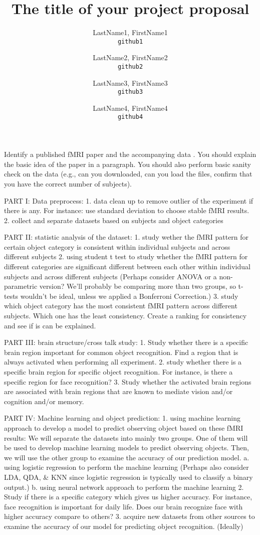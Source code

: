 \documentclass[11pt]{article}
\title{The title of your project proposal}
\author{
  LastName1, FirstName1\\
  \texttt{github1}
  \and
  LastName2, FirstName2\\
  \texttt{github2}
  \and
  LastName3, FirstName3\\
  \texttt{github3}
  \and
  LastName4, FirstName4\\
  \texttt{github4}
}
\begin{document}
\maketitle

Identify a published fMRI paper and the accompanying data
\cite{lindquist2008statistical}.  You should explain the basic idea of the
paper in a paragraph.  You should also perform basic sanity check on the data
(e.g., can you downloaded, can you load the files, confirm that you have the
correct number of subjects).



PART I: Data preprocess:
1. data clean up to remove outlier of the experiment if there is any.
For instance: use standard deviation to choose stable fMRI results.
2. collect and separate datasets based on subjects and object categories

PART II: statistic analysis of the dataset:
1. study wether the fMRI pattern for certain object category is consistent 
within individual subjects and across different subjects
2. using student t test to study whether the fMRI pattern for different 
categories are significant different between each other within individual 
subjects and across different subjects (Perhaps consider ANOVA or a non-
parametric version? We'll probably be comparing more than two groups, 
so t-tests wouldn't be ideal, unless we applied a Bonferroni Correction.)
3. study which object category has the most consistent fMRI pattern across 
different subjects. Which one has the least consistency. 
Create a ranking for consistency and see if is can be explained.

PART III: brain structure/cross talk study:
1. Study whether there is a specific brain region important for common 
object recognition. Find a region that is always activated when 
performing all experiment.
2. study whether there is a specific brain region for specific object 
recognition. For instance, is there a specific region for face recognition?
3. Study whether the activated brain regions are associated with brain 
regions that are known to mediate vision and/or cognition and/or memory.

PART IV: Machine learning and object prediction:
1. using machine learning approach to develop a model to predict observing 
object based on these fMRI results:
We will separate the datasets into mainly two groups. One of them will 
be used to develop machine learning models to predict observing objects. 
Then, we will use the other group to examine the accuracy of our 
prediction model.
a. using logistic regression to perform the machine learning (Perhaps also
consider LDA, QDA, & KNN since logistic regression is typically used 
to classify a binary output.)
b. using neural network approach to perform the machine learning
2. Study if there is a specific category which gives us higher accuracy. 
For instance, face recognition is important for daily life. 
Does our brain recognize face with higher accuracy compare to others?
3. acquire new datasets from other sources to examine the accuracy of 
our model for predicting object recognition. (Ideally)

 


\end{document}
